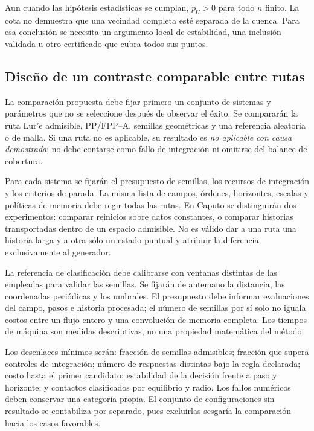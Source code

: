 Aun cuando las hipótesis estadísticas se cumplan, $p_U>0$ para todo $n$
finito. La cota no demuestra que una vecindad completa esté separada de la
cuenca. Para esa conclusión se necesita un argumento local de estabilidad,
una inclusión validada u otro certificado que cubra todos sus puntos.

\subsection{Diseño de un contraste comparable entre rutas}

La comparación propuesta debe fijar primero un conjunto de sistemas y
parámetros que no se seleccione después de observar el éxito. Se compararán
la ruta Lur'e admisible, PP/FPP--A, semillas geométricas y una referencia
aleatoria o de malla. Si una ruta no es aplicable, su resultado es
\emph{no aplicable con causa demostrada}; no debe contarse como fallo de
integración ni omitirse del balance de cobertura.

Para cada sistema se fijarán el presupuesto de semillas, los recursos de
integración y los criterios de parada. La misma lista de campos, órdenes,
horizontes, escalas y políticas de memoria debe regir todas las rutas.
En Caputo se distinguirán dos experimentos: comparar reinicios sobre datos
constantes, o comparar historias transportadas dentro de un espacio
admisible. No es válido dar a una ruta una historia larga y a otra sólo un
estado puntual y atribuir la diferencia exclusivamente al generador.

La referencia de clasificación debe calibrarse con ventanas distintas de
las empleadas para validar las semillas. Se fijarán de antemano la distancia,
las coordenadas periódicas y los umbrales. El presupuesto debe informar
evaluaciones del campo, pasos e historia procesada; el número de semillas
por sí solo no iguala costos entre un flujo entero y una convolución de
memoria completa. Los tiempos de máquina son medidas descriptivas, no una
propiedad matemática del método.

Los desenlaces mínimos serán: fracción de semillas admisibles; fracción que
supera controles de integración; número de respuestas distintas bajo la
regla declarada; costo hasta el primer candidato; estabilidad de la decisión
frente a paso y horizonte; y contactos clasificados por equilibrio y radio.
Los fallos numéricos deben conservar una categoría propia. El conjunto de
configuraciones sin resultado se contabiliza por separado, pues excluirlas
sesgaría la comparación hacia los casos favorables.

